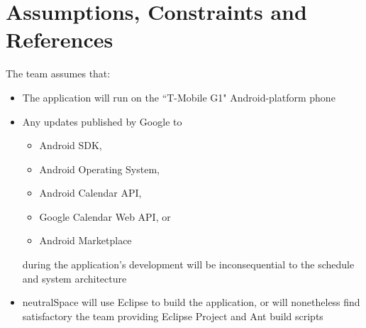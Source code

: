 \documentclass[11pt]{article}
\begin{document}
\section{Assumptions, Constraints and References}
	The team assumes that:
	\begin{itemize}
	\item The application will run on the ``T-Mobile G1" Android-platform phone
	\item Any updates published by Google to
		\begin{itemize}
		\item Android SDK,
		\item Android Operating System,
		\item Android Calendar API,
		\item Google Calendar Web API, or
		\item Android Marketplace
		\end{itemize}
		during the application's development will be inconsequential to the schedule and system architecture
	\item neutralSpace will use Eclipse to build the application, or will nonetheless find satisfactory the team providing Eclipse Project and Ant build scripts
	\end{itemize}
\end{document}
